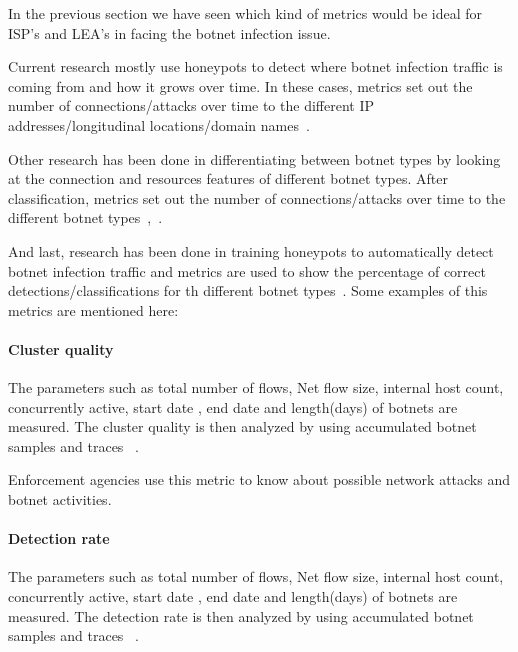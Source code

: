 

In the previous section we have seen which kind of metrics would be ideal for ISP's and LEA's in facing the botnet infection issue.

Current research mostly use honeypots to detect where botnet infection traffic is coming from and how it grows over time. In these cases, metrics set out the number of connections/attacks over time to the different IP addresses/longitudinal locations/domain names~\cite{AM2006}.

Other research has been done in differentiating between botnet types by looking at the connection and resources features of different botnet types. After classification, metrics set out the number of connections/attacks over time to the different botnet types~\cite{GJ2007},~\cite{AM2005}.

And last, research has been done in training honeypots to automatically detect botnet infection traffic and metrics are used to show the percentage of correct detections/classifications for th different botnet types~\cite{haltas2014automated}.
Some examples of this metrics are mentioned here:
\paragraph{Cluster quality }

The  parameters such as total number of flows, Net flow size, internal host count, concurrently  active, start date , end date and length(days) of botnets are measured. The cluster quality is then analyzed by using accumulated botnet samples and traces ~\cite{haltas2014automated}.

Enforcement agencies use this metric to know about possible network attacks and botnet activities.


\paragraph{ Detection rate }

The  parameters such as total number of flows, Net flow size, internal host count, concurrently  active, start date , end date and length(days) of botnets are measured. The detection rate is then analyzed by using accumulated botnet samples and traces ~\cite{haltas2014automated}.

